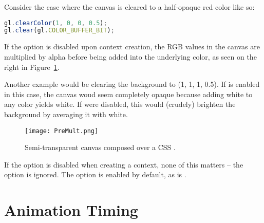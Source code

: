 Consider the case where the canvas is cleared to a half-opaque red color like so:

\begin{lstlisting}[language=JavaScript]
gl.clearColor(1, 0, 0, 0.5);
gl.clear(gl.COLOR_BUFFER_BIT);
\end{lstlisting}

If the  option is disabled upon context creation, the RGB values in the canvas are multiplied by alpha before being added into the underlying color, as seen on the right in Figure~\ref{fig:PreMult}.

Another example would be clearing the background to (1, 1, 1, 0.5).  If  is enabled in this case, the canvas woud seem completely opaque because adding white to any color yields white.  If  were disabled, this would (crudely) brighten the background by averaging it with white.

\begin{figure}[htb]\centering
  \texttt{[image: PreMult.png]}
  \caption{Semi-transparent canvas composed over a CSS .}
  \label{fig:PreMult}
\end{figure}

If the  option is disabled when creating a context, none of this matters -- the  option is ignored.  The  option is enabled by default, as is .

\begin{comment}
Note that we're not addressing css-opacity.

In this book, we never add children elements to \code{<canvas>}, but there's nothing wrong with doing so.  On some platforms, this can degrade performance, although this is improving as WebGL implementations are maturing.

http://www.svgopen.org/2005/papers/abstractsvgopen/
http://stackoverflow.com/questions/9491417/when-webgl-decide-to-update-the-display?answertab=votes#tab-top

\end{comment}

\section{Animation Timing}

